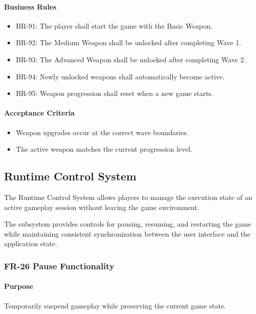 \documentclass[11pt,a4paper]{article}
\begin{document}
\paragraph{Business Rules}
\begin{itemize}
  \item BR-91: The player shall start the game with the Basic Weapon.
  \item BR-92: The Medium Weapon shall be unlocked after completing Wave 1.
  \item BR-93: The Advanced Weapon shall be unlocked after completing Wave 2.
  \item BR-94: Newly unlocked weapons shall automatically become active.
  \item BR-95: Weapon progression shall reset when a new game starts.
\end{itemize}

\paragraph{Acceptance Criteria}
\begin{itemize}
  \item Weapon upgrades occur at the correct wave boundaries.
  \item The active weapon matches the current progression level.
\end{itemize}

\subsection{Runtime Control System}

The Runtime Control System allows players to manage the execution state of an
active gameplay session without leaving the game environment.

The subsystem provides controls for pausing, resuming, and restarting the game
while maintaining consistent synchronization between the user interface and the
application state.

\subsubsection{FR-26 Pause Functionality}

\paragraph{Purpose}
Temporarily suspend gameplay while preserving the current game state.
\end{document}
